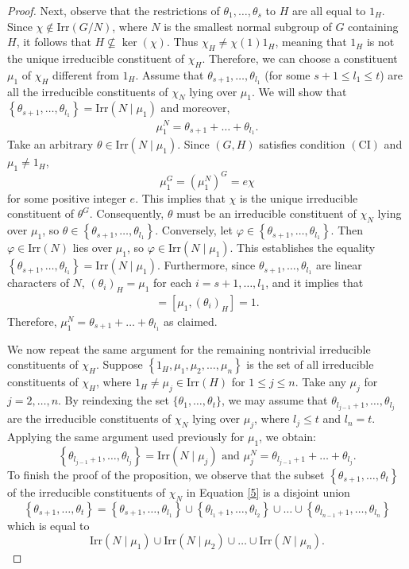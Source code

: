 \documentclass[twoside,a4paper,reqno,11pt]{amsart}
\newcommand{\<}{\langle}
\renewcommand{\>}{\rangle}
\newcommand{\leqs}{\leqslant}
\newcommand{\Irr}{\mathrm {Irr}}
\newcommand{\CI}{\mathrm{(CI)}}
\renewcommand{\leq}{\leqs}
\renewcommand{\:}{\colon}
\theoremstyle{definition}
\begin{document}
\begin{proof}
	Next, observe that the restrictions of $\theta_1,\ldots,\theta_s$ to $H$  are all equal to $1_H$. 
	Since $\chi\notin \Irr(G/N)$, where $N$ is the smallest normal subgroup of $G$ containing $H$, it follows that $H\nsubseteq \ker(\chi)$. Thus $\chi_H\neq \chi(1)1_H$, meaning that $1_H$ is not the unique irreducible constituent of $\chi_H$. Therefore, we can choose a constituent $\mu_1$ of $\chi_H$ different from $1_H$.  Assume that $\theta_{s+1},\ldots,\theta_{l_1}$ 
	(for some $s+1\leq l_1\leq t$) are all the irreducible constituents of $\chi_N$ lying over $\mu_1$. 
	We will show that $\left\{\theta_{s+1},\ldots,\theta_{l_1}\right\} = \Irr(N\mid \mu_1)$ and moreover, 
	\begin{align*}
		\mu_1^N = \theta_{s+1}+\ldots  + \theta_{l_1}.
	\end{align*}
	Take an arbitrary   $\theta\in \Irr(N\mid \mu_1)$.  Since $(G,H)$ satisfies condition $\CI$ and $\mu_1\neq 1_H$,  $$\mu_1^G  = (\mu_1^N)^G = e\chi$$ for some positive integer $e$. This implies that $\chi$ is the unique irreducible constituent of $\theta^G$.  Consequently,  $\theta$ must be an irreducible constituent of $\chi_N$ lying over $\mu_1$,  so $\theta\in \left\{\theta_{s+1},\ldots,\theta_{l_1}\right\}$. Conversely, let $\varphi\in \left\{\theta_{s+1},\ldots,\theta_{l_1}\right\}$. Then $ \varphi \in \Irr(N)$ lies over $\mu_1$, so $\varphi\in \Irr(N\mid \mu_1)$. This establishes the equality  $\left\{\theta_{s+1},\ldots,\theta_{l_1}\right\} = \Irr(N\mid \mu_1)$. Furthermore, since $\theta_{s+1},\ldots,\theta_{l_1}$ are linear characters of $N$, $(\theta_{i})_H = \mu_1$ for each $i=s+1,\ldots,l_1$, and it implies that
	\begin{align*}
		[\mu_1^N,\theta_i] = [\mu_1,(\theta_i)_H] = 1.
	\end{align*}
	Therefore, $\mu_1^N = \theta_{s+1} + \ldots + \theta_{l_1}$ as claimed. 
	
	We now repeat the same argument for the remaining nontrivial irreducible constituents of $\chi_H$.   Suppose $\left\{1_H,\mu_1,\mu_2,\ldots,\mu_n\right\}$ is the set of all  irreducible constituents of $\chi_H$, where  $1_H\neq \mu_j\in\Irr(H)$ for $1\leq j\leq n$.	
	Take any $\mu_j$ for $j=2,\dots,n $.  By reindexing the set $\{\theta_1,\dots,\theta_t\}$, we may assume that $\theta_{l_{j-1}+1},\ldots,\theta_{l_j}$ are the irreducible constituents of $\chi_N$ lying over $\mu_j$, where $l_j\leq t$ and  $l_n=t$. Applying the same argument used previously for $\mu_1$, we obtain: $$\left\{\theta_{l_{j-1}+1},\ldots,\theta_{l_j}\right\} = \Irr(N\mid \mu_j)\text{ and }\mu_j^N = \theta_{l_{j-1}+1} + \ldots + \theta_{l_j}.$$  
	To finish the proof of the proposition, we observe that the subset $\left\{\theta_{s+1},\ldots,\theta_{t}\right\}$ of the irreducible constituents of $\chi_N$ in Equation \eqref{5} is a disjoint union
	$$\left\{\theta_{s+1},\ldots,\theta_{t}\right\} = \left\{\theta_{s+1},\ldots,\theta_{l_1}\right\}\cup \left\{\theta_{l_1+1},\ldots,\theta_{l_2}\right\}\cup\ldots\cup\left\{\theta_{l_{n-1}+1},\ldots,\theta_{l_n}\right\}$$ which is equal to
	$$ \Irr(N\mid \mu_1)\cup\Irr(N\mid \mu_2)\cup\ldots\cup\Irr(N\mid \mu_n).$$
	

\end{proof}
\end{document}
